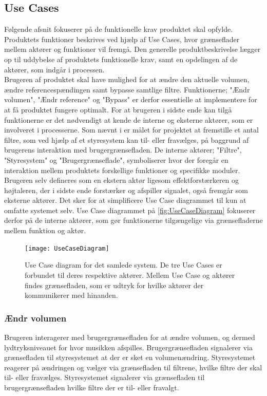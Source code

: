 \subsection{Use Cases} 
\label{UseCases}
%
Følgende afsnit fokuserer på de funktionelle krav produktet skal opfylde. Produktets funktioner beskrives ved hjælp af Use Cases, hvor grænseflader mellem aktører og funktioner vil fremgå. Den generelle produktbeskrivelse lægger op til uddybelse af produktets funktionelle krav, samt en opdelingen af de aktører, som indgår i processen.\\
Brugeren af produktet skal have mulighed for at ændre den aktuelle volumen, ændre referencespændingen samt bypasse samtlige filtre. Funktionerne; "Ændr volumen", "Ændr reference" og "Bypass" er derfor essentielle at implementere for at få produktet fungere optimalt. For at brugeren i sidste ende kan tilgå funktionerne er det nødvendigt at kende de interne og eksterne aktører, som er involveret i processerne. Som nævnt i  er målet for projektet at fremstille et antal filtre, som ved hjælp af et styresystem kan til- eller fravælges, på baggrund af brugerens interaktion med brugergrænsefladen. De interne aktører; "Filtre", "Styresystem" og "Brugergrænseflade", symboliserer hvor der foregår en interaktion mellem produktets forskellige funktioner og specifikke moduler. Brugeren selv defineres som en ekstern aktør ligesom effektforstærkeren og højtaleren, der i sidste ende forstærker og afspiller signalet, også fremgår som eksterne aktører. Det sker for at simplificere Use Case diagrammet til kun at omfatte systemet selv. Use Case diagrammet på \autoref{fig:UseCaseDiagram} fokuserer derfor på de interne aktører, som gør funktionerne tilgængelige via grænsefladerne mellem funktion og aktør.       
%
\begin{figure}[H]
	\centering
	\texttt{[image: UseCaseDiagram]}
	\caption{Use Case diagram for det samlede system. De tre Use Cases er forbundet til deres respektive aktører. Mellem Use Case og aktører findes grænsefladen, som er udtryk for hvilke aktører der kommunikerer med hinanden.}
	\label{fig:UseCaseDiagram}
\end{figure}
\noindent   

\subsubsection{Ændr volumen} 
\label{AendreVolumen}       
%
Brugeren interagerer med brugergrænsefladen for at ændre volumen, og dermed lydtryksniveauet for hvor musikken afspilles. Brugergrænsefladen signalerer via grænsefladen til styresystemet at der er sket en volumenændring. Styresystemet reagerer på ændringen og vælger via grænsefladen til filtrene, hvilke filtre der skal til- eller fravælges. Styresystemet signalerer via grænsefladen til brugergrænsefladen hvilke filtre der er til- eller fravalgt. 

